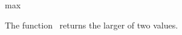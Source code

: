 \begin{ccRefFunction}{max}

\ccDefinition

The function \ccRefName\ returns the larger of two values.



\\

\end{ccRefFunction}
